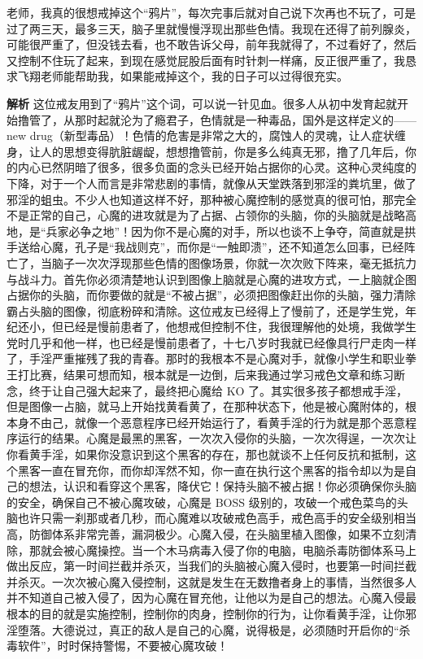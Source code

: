 \begin{case}
    老师，我真的很想戒掉这个“鸦片”，每次完事后就对自己说下次再也不玩了，可是过了两三天，最多三天，脑子里就慢慢浮现出那些色情。我现在还得了前列腺炎，可能很严重了，但没钱去看，也不敢告诉父母，前年我就得了，不过看好了，然后又控制不住玩了起来，到现在感觉屁股后面有时针刺一样痛，反正很严重了，我恳求飞翔老师能帮助我，如果能戒掉这个，我的日子可以过得很充实。

    \textbf{解析} 这位戒友用到了“鸦片”这个词，可以说一针见血。很多人从初中发育起就开始撸管了，从那时起就沦为了瘾君子，色情就是一种毒品，国外是这样定义的——new drug（新型毒品）！色情的危害是非常之大的，腐蚀人的灵魂，让人症状缠身，让人的思想变得肮脏龌龊，想想撸管前，你是多么纯真无邪，撸了几年后，你的内心已然阴暗了很多，很多负面的念头已经开始占据你的心灵。这种心灵纯度的下降，对于一个人而言是非常悲剧的事情，就像从天堂跌落到邪淫的粪坑里，做了邪淫的蛆虫。不少人也知道这样不好，那种被心魔控制的感觉真的很可怕，那完全不是正常的自己，心魔的进攻就是为了占据、占领你的头脑，你的头脑就是战略高地，是“兵家必争之地”！因为你不是心魔的对手，所以也谈不上争夺，简直就是拱手送给心魔，孔子是“我战则克”，而你是“一触即溃”，还不知道怎么回事，已经阵亡了，当脑子一次次浮现那些色情的图像场景，你就一次次败下阵来，毫无抵抗力与战斗力。首先你必须清楚地认识到图像上脑就是心魔的进攻方式，一上脑就企图占据你的头脑，而你要做的就是“不被占据”，必须把图像赶出你的头脑，强力清除霸占头脑的图像，彻底粉碎和清除。这位戒友已经得上了慢前了，还是学生党，年纪还小，但已经是慢前患者了，他想戒但控制不住，我很理解他的处境，我做学生党时几乎和他一样，也已经是慢前患者了，十七八岁时我就已经像具行尸走肉一样了，手淫严重摧残了我的青春。那时的我根本不是心魔对手，就像小学生和职业拳王打比赛，结果可想而知，根本就是一边倒，后来我通过学习戒色文章和练习断念，终于让自己强大起来了，最终把心魔给 KO 了。其实很多孩子都想戒手淫，但是图像一占脑，就马上开始找黄看黄了，在那种状态下，他是被心魔附体的，根本身不由己，就像一个恶意程序已经开始运行了，看黄手淫的行为就是那个恶意程序运行的结果。心魔是最黑的黑客，一次次入侵你的头脑，一次次得逞，一次次让你看黄手淫，如果你没意识到这个黑客的存在，那也就谈不上任何反抗和抵制，这个黑客一直在冒充你，而你却浑然不知，你一直在执行这个黑客的指令却以为是自己的想法，认识和看穿这个黑客，降伏它！保持头脑不被占据！你必须确保你头脑的安全，确保自己不被心魔攻破，心魔是 BOSS 级别的，攻破一个戒色菜鸟的头脑也许只需一刹那或者几秒，而心魔难以攻破戒色高手，戒色高手的安全级别相当高，防御体系非常完善，漏洞极少。心魔入侵，在头脑里植入图像，如果不立刻清除，那就会被心魔操控。当一个木马病毒入侵了你的电脑，电脑杀毒防御体系马上做出反应，第一时间拦截并杀灭，当我们的头脑被心魔入侵时，也要第一时间拦截并杀灭。一次次被心魔入侵控制，这就是发生在无数撸者身上的事情，当然很多人并不知道自己被入侵了，因为心魔在冒充他，让他以为是自己的想法。心魔入侵最根本的目的就是实施控制，控制你的肉身，控制你的行为，让你看黄手淫，让你邪淫堕落。大德说过，真正的敌人是自己的心魔，说得极是，必须随时开启你的“杀毒软件”，时时保持警惕，不要被心魔攻破！
\end{case}


